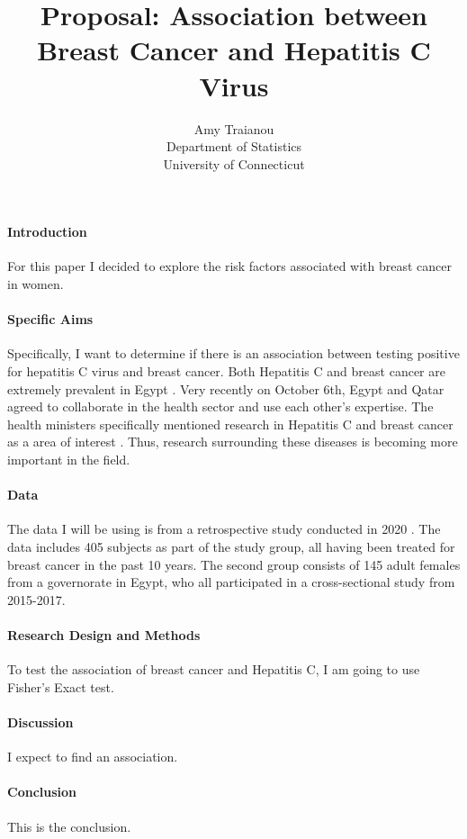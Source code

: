 \documentclass[12pt]{article}
\title{Proposal: Association between Breast Cancer and Hepatitis C Virus}
\author{Amy Traianou\\
  Department of Statistics\\
  University of Connecticut
}
\begin{document}
\maketitle


\paragraph{Introduction}
For this paper I decided to explore the risk factors associated with breast cancer in women. 
\citep{dwivedi2017analysis}


\paragraph{Specific Aims}
Specifically, I want to determine if there is an association between testing positive for hepatitis C virus
and breast cancer. Both Hepatitis C and breast cancer are extremely prevalent in Egypt \citep{Hussein2021high}. 
Very recently on October 6th, Egypt and Qatar agreed to collaborate in the health sector and use each 
other's expertise. The health ministers specifically mentioned research in Hepatitis C and breast cancer
as a area of interest \citep{arham2022egypt}. Thus, research surrounding these diseases is becoming more
important in the field. 

\paragraph{Data}
The data I will be using is from a retrospective study conducted in 2020 \citep{2020association}. The data includes 405 subjects as
part of the study group, all having been treated for breast cancer in the past 10 years. The second group consists of 145 adult females
from a governorate in Egypt, who all participated in a cross-sectional study from 2015-2017.

\paragraph{Research Design and Methods}
To test the association of breast cancer and Hepatitis C, I am going to use Fisher's Exact test. 

\paragraph{Discussion}
I expect to find an association. 

\paragraph{Conclusion}
This is the conclusion. 





\end{document}
